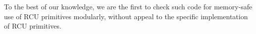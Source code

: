 To the best of our knowledge, we are the first to check such code for memory-safe use of RCU primitives modularly, without appeal to the specific implementation of RCU primitives.
\begin{comment}
The most subtle aspect of the deletion is the final step in the case the node $H_1$ to remove has both children.  In this case, the value $H'_1$ of the left-most node of $H_1$'s right child --- the next element in the collection order --- is copied into a new node, which is then used to \emph{replace} node $H_1$: the replacement's fields exactly match $H_1$'s except for the data (\textsc{T-Replace} via $\N_1 = \N_2$), and the parent is updated to reference the replacement, unlinking $H_1$. At this point, there are two nodes with value $H'_1$ in the tree (\textit{weak} BST property of the Citrus~\cite{Arbel:2014:CUR:2611462.2611471}): the replacement node, and what was the left-most node under $H_1$'s right child. This latter (original) node for $H'_1$ must be unlinked, which is simplified because by being left-most the left child is null, avoiding another round of replacement (\textsc{T-UnlinkH} via $\forall_{f\in dom(\N_1)} \ldotp f\neq f_2 \implies (\N_1(f) = \textsf{null}$).
The complexity in checking safety here is that once $H_1$ is found, another loop is used to find $H'_1$ and its parent (since that node will later be removed as well).
After $H'_1$ is found, there are \emph{two} local unlinking operations, at different depths of the tree.  This is why the type system must keep separate abstract iteration counts for traversals in loops --- these indices act like multiple cursors into the data structure, and allow the types to carry enough information to keep those changes separate and ensure neither introduces a cycle.

To the best of our knowledge, we are the first to check such code for memory-safe use of RCU primitives modularly, without appeal to the specific implementation of RCU primitives.


There are two 


\end{comment}
